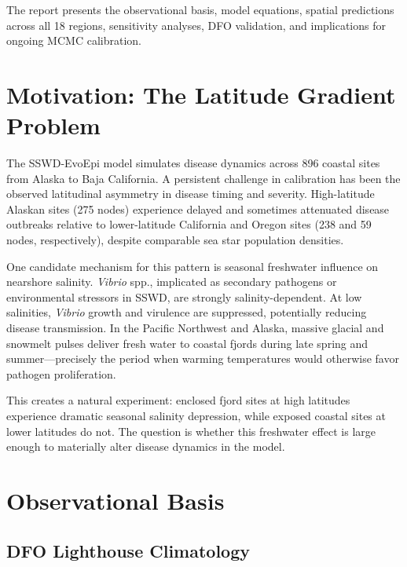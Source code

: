 \documentclass[11pt,a4paper]{article}
\begin{document}
The report presents the observational basis, model equations, spatial predictions across all 18 regions, sensitivity analyses, DFO validation, and implications for ongoing MCMC calibration.

\section{Motivation: The Latitude Gradient Problem}
\label{sec:motivation}

The SSWD-EvoEpi model simulates disease dynamics across 896 coastal sites from Alaska to Baja California. A persistent challenge in calibration has been the observed latitudinal asymmetry in disease timing and severity. High-latitude Alaskan sites (275 nodes) experience delayed and sometimes attenuated disease outbreaks relative to lower-latitude California and Oregon sites (238 and 59 nodes, respectively), despite comparable sea star population densities.

One candidate mechanism for this pattern is seasonal freshwater influence on nearshore salinity. \textit{Vibrio} spp., implicated as secondary pathogens or environmental stressors in SSWD, are strongly salinity-dependent. At low salinities, \textit{Vibrio} growth and virulence are suppressed, potentially reducing disease transmission. In the Pacific Northwest and Alaska, massive glacial and snowmelt pulses deliver fresh water to coastal fjords during late spring and summer---precisely the period when warming temperatures would otherwise favor pathogen proliferation.

This creates a natural experiment: enclosed fjord sites at high latitudes experience dramatic seasonal salinity depression, while exposed coastal sites at lower latitudes do not. The question is whether this freshwater effect is large enough to materially alter disease dynamics in the model.

\section{Observational Basis}
\label{sec:observations}

\subsection{DFO Lighthouse Climatology}
\end{document}
